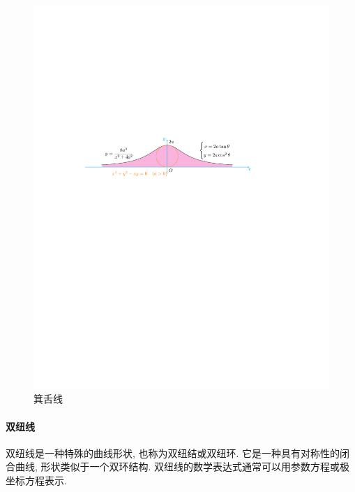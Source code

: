 \begin{figure}[H]
    \centering
    \includegraphics{figures/MiTongueLine.pdf}
    \caption{箕舌线}
    \label{miTongueLine}
\end{figure}

\paragraph{双纽线}

双纽线是一种特殊的曲线形状, 也称为双纽结或双纽环. 它是一种具有对称性的闭合曲线, 形状类似于一个双环结构. 双纽线的数学表达式通常可以用参数方程或极坐标方程表示. 

